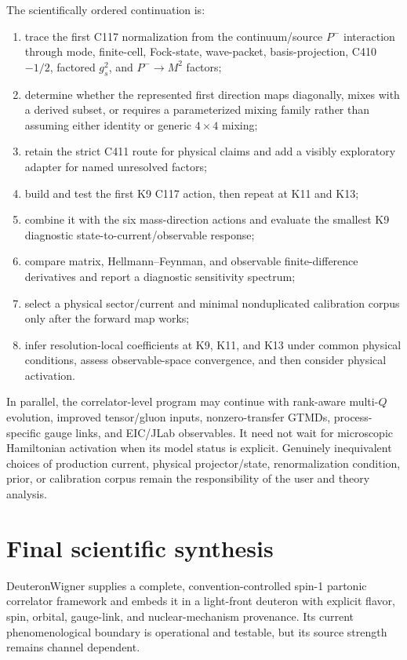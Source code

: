 \documentclass[11pt,oneside]{book}
\begin{document}
The scientifically ordered continuation is:
\begin{enumerate}[label=\textbf{Step \arabic*:}]
 \item trace the first C117 normalization from the continuum/source $P^-$ interaction through mode, finite-cell, Fock-state, wave-packet, basis-projection, C410 $-1/2$, factored $g_s^2$, and $P^-\to M^2$ factors;
 \item determine whether the represented first direction maps diagonally, mixes with a derived subset, or requires a parameterized mixing family rather than assuming either identity or generic $4\times4$ mixing;
 \item retain the strict C411 route for physical claims and add a visibly exploratory adapter for named unresolved factors;
 \item build and test the first K9 C117 action, then repeat at K11 and K13;
 \item combine it with the six mass-direction actions and evaluate the smallest K9 diagnostic state-to-current/observable response;
 \item compare matrix, Hellmann--Feynman, and observable finite-difference derivatives and report a diagnostic sensitivity spectrum;
 \item select a physical sector/current and minimal nonduplicated calibration corpus only after the forward map works;
 \item infer resolution-local coefficients at K9, K11, and K13 under common physical conditions, assess observable-space convergence, and then consider physical activation.
\end{enumerate}
In parallel, the correlator-level program may continue with rank-aware multi-$Q$ evolution, improved tensor/gluon inputs, nonzero-transfer GTMDs, process-specific gauge links, and EIC/JLab observables.  It need not wait for microscopic Hamiltonian activation when its model status is explicit.  Genuinely inequivalent choices of production current, physical projector/state, renormalization condition, prior, or calibration corpus remain the responsibility of the user and theory analysis.

\section{Final scientific synthesis}

DeuteronWigner supplies a complete, convention-controlled spin-1 partonic correlator framework and embeds it in a light-front deuteron with explicit flavor, spin, orbital, gauge-link, and nuclear-mechanism provenance.  Its current phenomenological boundary is operational and testable, but its source strength remains channel dependent.
\end{document}
